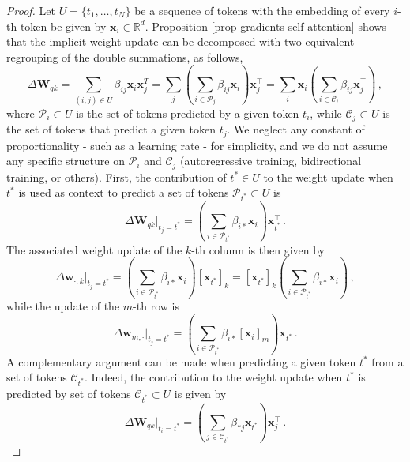 \begin{proof}
%
Let $U = \{t_1, \dots, t_N\}$ be a sequence of tokens with the embedding of every $i$-th token be given by $\bm{x}_i \in \mathbb{R}^d$.
%
Proposition \ref{prop-gradients-self-attention} shows that the implicit weight update can be decomposed with two equivalent regrouping of the double summations, as follows,
%
\begin{equation}
\Delta \bm{W}_{qk} = \sum_{(i,j) \in U} \beta_{ij}\bm{x}_i\bm{x}_j^T 
= \sum_j \left(\sum_{i\in \mathcal{P}_j} \beta_{ij}\bm{x}_i\right)\bm{x}^\top_j
= \sum_i \bm{x}_i\left(\sum_{i\in \mathcal{C}_i} \beta_{ij}\bm{x}^\top_j\right)\,,
\end{equation}
%
where $\mathcal{P}_{i} \subset U$ is the set of tokens predicted by a given token $t_i$, while $\mathcal{C}_{j} \subset U$ is the set of tokens that predict a given token $t_j$.
%
%
We neglect any constant of proportionality - such as a learning rate - for simplicity, and we do not assume any specific structure on $\mathcal{P}_i$ and $\mathcal{C}_j$ (autoregressive training, bidirectional training, or others).
%
First, the contribution of $t^* \in U$ to the weight update when $t^*$ is used as context to predict a set of tokens $\mathcal{P}_{t^*} \subset U$ is
\begin{equation}
\Delta \bm{W}_{qk} \bigg|_{t_j = t^*}
= \left(\sum_{i\in \mathcal{P}_{t^*}} \beta_{i*}\bm{x}_i\right)\bm{x}^\top_{t^*}\,.
\end{equation}
%
The associated weight update of the $k$-th column is then given by
%
\begin{equation}
    \Delta \bm{w}_{\cdot, k} \bigg|_{t_j = t^*} = 
    \left(\sum_{i\in \mathcal{P}_{t^*}} \beta_{i*}\bm{x}_i\right)[\bm{x}_{t^*}]_k
    =
    [\bm{x}_{t^*}]_k \left(\sum_{i \in \mathcal{P}_{t^*}}\beta_{i*}\bm{x}_i\right)\,,
\end{equation}
%
while the update of the $m$-th row is
%
\begin{equation}
    \Delta \bm{w}_{m, \cdot} \bigg|_{t_j = t^*} = \left(\sum_{i \in \mathcal{P}_{t^*}}\beta_{i*}[\bm{x}_i]_m\right)\bm{x}_{t^*} \,.
\end{equation}
%
A complementary argument can be made when predicting a given token $t^*$ from a set of tokens $\mathcal{C}_{t^*}$.
%
Indeed, the contribution to the weight update when $t^*$ is predicted by set of tokens $\mathcal{C}_{t^*} \subset U$ is given by 
%
\begin{equation}
\Delta \bm{W}_{qk} \bigg|_{t_i = t^*}
= \left(\sum_{j\in \mathcal{C}_{t^*}} \beta_{*j}\bm{x}_{t^*}\right)\bm{x}_j^\top\,.

\end{equation}
\end{proof}
